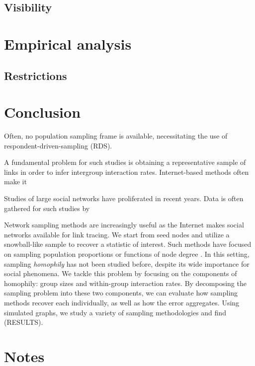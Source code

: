 \documentclass[a4paper]{article}
\begin{document}
\subsection{Visibility}



\section{Empirical analysis}

\subsection{Restrictions}

\section{Conclusion}


Often, no population sampling frame is available, necessitating the use of respondent-driven-sampling (RDS).


A fundamental problem for such studies is obtaining a representative sample of links in order to infer intergroup interaction rates. Internet-based methods often make it

Studies of large social networks have proliferated in recent years. Data is often gathered for such studies by

Network sampling methods are increasingly useful as the Internet makes social networks available for link tracing. We start from seed nodes and utilize a snowball-like sample to recover a statistic of interest. Such methods have focused on sampling population proportions \cite{heckathorn_respondent-driven_2002} or functions of node degree \cite{karimi_visibility_2017}. In this setting, sampling \emph{homophily} \cite{currarini_economic_2009} has not been studied before, despite its wide importance for social phenomena. We tackle this problem by focusing on the components of homophily: group sizes and within-group interaction rates. By decomposing the sampling problem into these two components, we can evaluate how sampling methods recover each individually, as well as how the error aggregates. Using simulated graphs, we study a variety of sampling methodologies and find (RESULTS).

\section{Notes}
\end{document}
